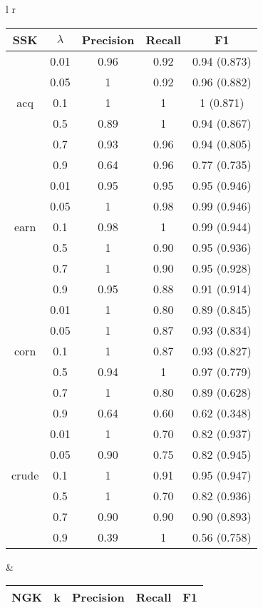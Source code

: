 
\begin{tabular}{l r}
\begin{tabular}{| c | c | c | c | c | }
	\hline SSK & $ \lambda  $& Precision & Recall & F1   \\ \hline	
	
	& 0.01 & 0.96 & 0.92 & 0.94  (0.873)   \\ 
	& 0.05 & 1 & 0.92 & 0.96 (0.882)   \\ 
	acq & 0.1 & 1& 1 &  1 (0.871)  \\
	& 0.5 & 0.89 & 1 & 0.94 (0.867)   \\ 
	& 0.7 & 0.93 & 0.96 & 0.94 (0.805)    \\ 
	& 0.9 & 0.64 & 0.96 & 0.77   (0.735)  \\ \hline
	
	
	& 0.01 & 0.95 & 0.95 &  0.95  (0.946)  \\	
	& 0.05 & 1 & 0.98 &  0.99  (0.946)  \\ 
	earn & 0.1 & 0.98 & 1 &  0.99  (0.944)  \\ 
	& 0.5 & 1 & 0.90 &  0.95  (0.936)  \\ 
	& 0.7 & 1 & 0.90 &  0.95  (0.928)  \\
	& 0.9 & 0.95 & 0.88 &  0.91  (0.914)  \\\hline
	
	
	
	& 0.01 & 1 & 0.80 & 0.89  (0.845)   \\ 
	& 0.05 & 1 & 0.87 & 0.93  (0.834)   \\ 
	corn & 0.1 & 1 & 0.87 & 0.93  (0.827)   \\ 
	& 0.5 & 0.94 & 1 &  0.97 (0.779)  \\ 
	& 0.7 & 1 & 0.80 & 0.89   (0.628)  \\ 
	& 0.9 & 0.64 & 0.60 & 0.62  (0.348)   \\ \hline
	
	
	& 0.01 & 1 & 0.70 &  0.82  (0.937)  \\
	& 0.05 & 0.90 & 0.75 &  0.82   (0.945) \\ 
	crude & 0.1 & 1 & 0.91 & 0.95 (0.947)    \\ 
	& 0.5 & 1 & 0.70 &  0.82 (0.936)   \\ 
	& 0.7 & 0.90 & 0.90 &  0.90  (0.893)  \\
	& 0.9 & 0.39 & 1 &  0.56  (0.758)  \\\hline
	
	
\end{tabular} &

\begin{tabular}{| c | c | c | c | c | }
	\hline NGK & k & Precision & Recall & F1   \\ \hline
	

\end{tabular}
\end{tabular}
